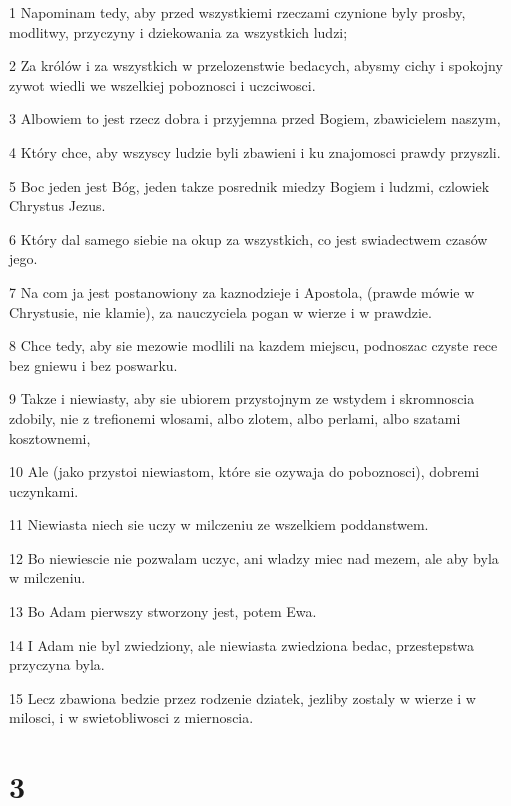 \par 1 Napominam tedy, aby przed wszystkiemi rzeczami czynione byly prosby, modlitwy, przyczyny i dziekowania za wszystkich ludzi;
\par 2 Za królów i za wszystkich w przelozenstwie bedacych, abysmy cichy i spokojny zywot wiedli we wszelkiej poboznosci i uczciwosci.
\par 3 Albowiem to jest rzecz dobra i przyjemna przed Bogiem, zbawicielem naszym,
\par 4 Który chce, aby wszyscy ludzie byli zbawieni i ku znajomosci prawdy przyszli.
\par 5 Boc jeden jest Bóg, jeden takze posrednik miedzy Bogiem i ludzmi, czlowiek Chrystus Jezus.
\par 6 Który dal samego siebie na okup za wszystkich, co jest swiadectwem czasów jego.
\par 7 Na com ja jest postanowiony za kaznodzieje i Apostola, (prawde mówie w Chrystusie, nie klamie), za nauczyciela pogan w wierze i w prawdzie.
\par 8 Chce tedy, aby sie mezowie modlili na kazdem miejscu, podnoszac czyste rece bez gniewu i bez poswarku.
\par 9 Takze i niewiasty, aby sie ubiorem przystojnym ze wstydem i skromnoscia zdobily, nie z trefionemi wlosami, albo zlotem, albo perlami, albo szatami kosztownemi,
\par 10 Ale (jako przystoi niewiastom, które sie ozywaja do poboznosci), dobremi uczynkami.
\par 11 Niewiasta niech sie uczy w milczeniu ze wszelkiem poddanstwem.
\par 12 Bo niewiescie nie pozwalam uczyc, ani wladzy miec nad mezem, ale aby byla w milczeniu.
\par 13 Bo Adam pierwszy stworzony jest, potem Ewa.
\par 14 I Adam nie byl zwiedziony, ale niewiasta zwiedziona bedac, przestepstwa przyczyna byla.
\par 15 Lecz zbawiona bedzie przez rodzenie dziatek, jezliby zostaly w wierze i w milosci, i w swietobliwosci z miernoscia.

\chapter{3}

